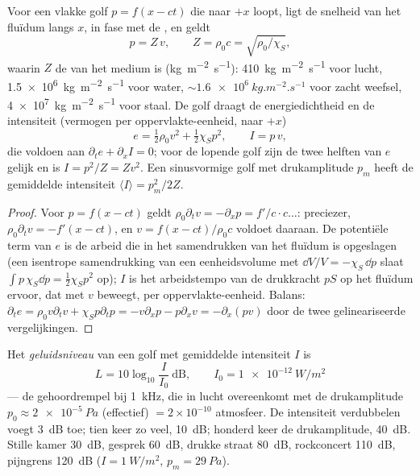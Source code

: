 \begin{proposition}\label{prop:b2:sound-waves:plane}
Voor een vlakke golf $p = f(x - ct)$ die naar $+x$ loopt, ligt de snelheid
van het fluïdum langs $x$, in fase met de , en geldt
\[
p = Z\,v , \qquad Z = \rho_0c = \sqrt{\rho_0/\chi_S} ,
\]
waarin $Z$ de \emph{} van het medium is
(\unit{kg.m^{-2}.s^{-1}}): \qty{410}{kg.m^{-2}.s^{-1}} voor lucht,
\qty{1.5e6}{kg.m^{-2}.s^{-1}} voor water,
$\sim\qty{1.6e6}{kg.m^{-2}.s^{-1}}$ voor zacht weefsel,
\qty{4e7}{kg.m^{-2}.s^{-1}} voor staal. De golf draagt de energiedichtheid
en de intensiteit (vermogen per oppervlakte-eenheid, naar $+x$)
\[
e = \tfrac12\rho_0v^2 + \tfrac12\chi_Sp^2 , \qquad I = p\,v ,
\]
die voldoen aan $\partial_te + \partial_xI = 0$; voor de lopende golf zijn
de twee helften van $e$ gelijk en is $I = p^2/Z = Zv^2$. Een sinusvormige
golf met drukamplitude $p_m$ heeft de gemiddelde intensiteit
$\langle I\rangle = p_m^2/2Z$.
\end{proposition}

\begin{proof}
Voor $p = f(x - ct)$ geldt
$\rho_0\partial_tv = -\partial_xp = f'/c\cdot c\dots$: preciezer,
$\rho_0\partial_tv = -f'(x - ct)$, en $v = f(x - ct)/\rho_0c$ voldoet
daaraan. De potentiële term van $e$ is de arbeid die in het samendrukken van
het fluïdum is opgeslagen (een isentrope samendrukking van een
eenheidsvolume met $\dd V/V = -\chi_S\,\dd p$ slaat
$\int p\,\chi_S\dd p = \tfrac12\chi_Sp^2$ op); $I$ is het arbeidstempo van
de drukkracht $pS$ op het fluïdum ervoor, dat met $v$ beweegt, per
oppervlakte-eenheid. Balans:
$\partial_te = \rho_0v\partial_tv + \chi_Sp\partial_tp = -v\partial_xp - p\partial_xv =
-\partial_x(pv)$
door de twee gelineariseerde vergelijkingen.
\end{proof}

\begin{definition}[Geluidsniveau]\label{def:b2:sound-waves:decibel}
Het \emph{geluidsniveau} van een golf met gemiddelde intensiteit $I$ is
\[
L = 10\log_{10}\frac I{I_0} \ \text{dB} , \qquad I_0 = \qty{1e-12}{W/m^2}
\]
--- de gehoordrempel bij \qty{1}{kHz}, die in lucht overeenkomt met de
drukamplitude $p_0 \approx \qty{2e-5}{Pa}$ (effectief) $= 2 \times 10^{-10}$
atmosfeer. De intensiteit verdubbelen voegt \qty{3}{dB} toe; tien keer zo
veel, \qty{10}{dB}; honderd keer de drukamplitude, \qty{40}{dB}. Stille
kamer \qty{30}{dB}, gesprek \qty{60}{dB}, drukke straat \qty{80}{dB},
rockconcert \qty{110}{dB}, pijngrens \qty{120}{dB} ($I = \qty{1}{W/m^2}$,
$p_m = \qty{29}{Pa}$).
\end{definition}

